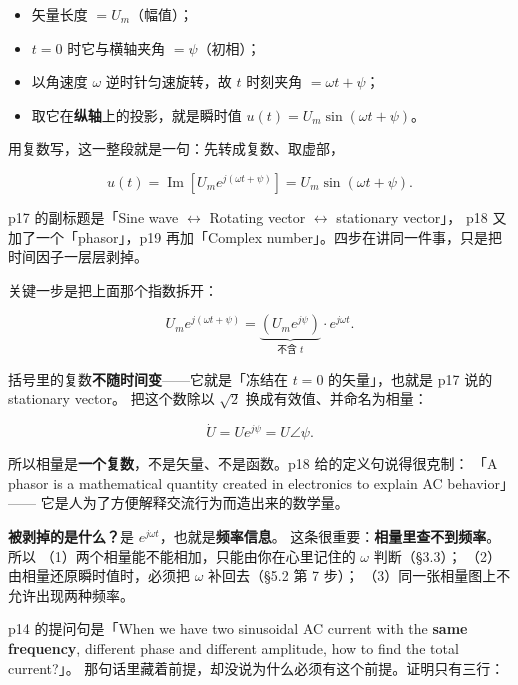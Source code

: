 \documentclass[11pt]{ctexart}
\begin{document}
\begin{itemize}
\item 矢量长度 $=U_m$（幅值）；
\item $t=0$ 时它与横轴夹角 $=\psi$（初相）；
\item 以角速度 $\omega$ 逆时针匀速旋转，故 $t$ 时刻夹角 $=\omega t+\psi$；
\item 取它在\textbf{纵轴}上的投影，就是瞬时值 $u(t)=U_m\sin(\omega t+\psi)$。
\end{itemize}

用复数写，这一整段就是一句：先转成复数、取虚部，

\[ u(t)=\operatorname{Im}\left[U_m e^{j(\omega t+\psi)}\right]=U_m\sin(\omega t+\psi) . \]



p17 的副标题是「Sine wave $\leftrightarrow$ Rotating vector $\leftrightarrow$ stationary vector」，
p18 又加了一个「phasor」，p19 再加「Complex number」。四步在讲同一件事，只是把时间因子一层层剥掉。

关键一步是把上面那个指数拆开：

\[ U_m e^{j(\omega t+\psi)}=\underbrace{\left(U_m e^{j\psi}\right)}_{\text{不含 }t}\cdot e^{j\omega t} . \]

括号里的复数\textbf{不随时间变}——它就是「冻结在 $t=0$ 的矢量」，也就是 p17 说的 stationary vector。
把这个数除以 $\sqrt2$ 换成有效值、并命名为相量：

\[ \dot U=U e^{j\psi}=U\angle\psi . \]

所以相量是\textbf{一个复数}，不是矢量、不是函数。p18 给的定义句说得很克制：
「A phasor is a mathematical quantity created in electronics to explain AC behavior」——
它是人为了方便解释交流行为而造出来的数学量。

\textbf{被剥掉的是什么？}是 $e^{j\omega t}$，也就是\textbf{频率信息}。
这条很重要：\textbf{相量里查不到频率}。所以
（1）两个相量能不能相加，只能由你在心里记住的 $\omega$ 判断（§3.3）；
（2）由相量还原瞬时值时，必须把 $\omega$ 补回去（§5.2 第 7 步）；
（3）同一张相量图上不允许出现两种频率。


p14 的提问句是「When we have two sinusoidal AC current with the \textbf{same frequency}, different
phase and different amplitude, how to find the total current?」。
那句话里藏着前提，却没说为什么必须有这个前提。证明只有三行：
\end{document}

